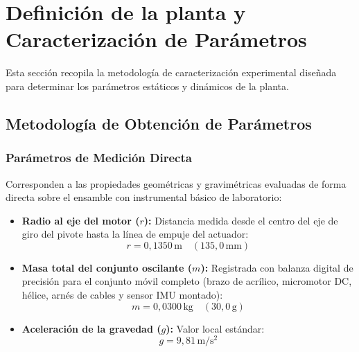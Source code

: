 \section{Definición de la planta y Caracterización de Parámetros}

Esta sección recopila la metodología de caracterización experimental diseñada para determinar los parámetros estáticos y dinámicos de la planta.

\subsection{Metodología de Obtención de Parámetros}

\subsubsection{Parámetros de Medición Directa}
Corresponden a las propiedades geométricas y gravimétricas evaluadas de forma directa sobre el ensamble con instrumental básico de laboratorio:
\begin{itemize}
  \item \textbf{Radio al eje del motor ($r$):} Distancia medida desde el centro del eje de giro del pivote hasta la línea de empuje del actuador:
  \begin{equation}
    r = 0{,}1350\,\mathrm{m} \quad (135{,}0\,\mathrm{mm})
  \end{equation}
  
  \item \textbf{Masa total del conjunto oscilante ($m$):} Registrada con balanza digital de precisión para el conjunto móvil completo (brazo de acrílico, micromotor DC, hélice, arnés de cables y sensor IMU montado):
  \begin{equation}
    m = 0{,}0300\,\mathrm{kg} \quad (30{,}0\,\mathrm{g})
  \end{equation}
  
  \item \textbf{Aceleración de la gravedad ($g$):} Valor local estándar:
  \begin{equation}
    g = 9{,}81\,\mathrm{m/s^2}
  \end{equation}
\end{itemize}

